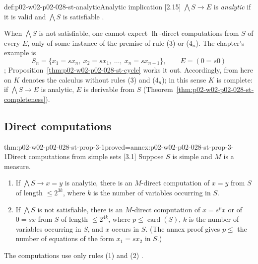 \begin{hbdefinition}{def:p02-w02-p02-028-st-analytic}{Analytic implication [2.15]}
\(\bigwedge S\to E\) is \emph{analytic} if it is valid and \(\bigwedge S\) is
satisfiable \cite[\S2.15, p.~904]{Statman1977}.
\end{hbdefinition}

When \(\bigwedge S\) is not satisfiable, one cannot expect
\(\operatorname{lh}\)-direct computations from \(S\) of every \(E\), only of
some instance of the premise of rule (3) or (\(4_n\)).  The chapter's example
is
\[
 S_n=\{x_1=sx_n,\ x_2=sx_1,\ \ldots,\ x_n=sx_{n-1}\},
 \qquad E=(0=s0)
\]
\cite[\S2.15, p.~904]{Statman1977}; Proposition~\ref{thm:p02-w02-p02-028-st-cycle}
works it out.  Accordingly, from here on \(K\) denotes the calculus without
rules (3) and (\(4_n\)); in this sense \(K\) is complete: if
\(\bigwedge S\to E\) is analytic, \(E\) is derivable from \(S\)
(Theorem~\ref{thm:p02-w02-p02-028-st-completeness}).

\subsection{Direct computations}
\label{sec:p02-w02-p02-028-st-direct}

\begin{hbtheorem}{thm:p02-w02-p02-028-st-prop-3-1}{proved=annex:p02-w02-p02-028-st-prop-3-1}{Direct computations from simple sets [3.1]}
Suppose \(S\) is simple and \(M\) is a measure.
\begin{enumerate}
  \item[(i)] If \(\bigwedge S\to x=y\) is analytic, there is an \(M\)-direct
        computation of \(x=y\) from \(S\) of length \(\leq2^{3k}\), where
        \(k\) is the number of variables occurring in \(S\).
  \item[(ii)] If \(\bigwedge S\) is not satisfiable, there is an
        \(M\)-direct computation of \(x=s^px\) or of \(0=sx\) from \(S\) of
        length \(\leq2^{4k}\), where \(p\leq\operatorname{card}(S)\), \(k\) is
        the number of variables occurring in \(S\), and \(x\) occurs in \(S\).
        (The annex proof gives \(p\leq\) the number of equations of the form
        \(x_1=sx_2\) in \(S\).)
\end{enumerate}
The computations use only rules (1) and (2) \cite[\S3.1, pp.~904--906]{Statman1977}.
\end{hbtheorem}

